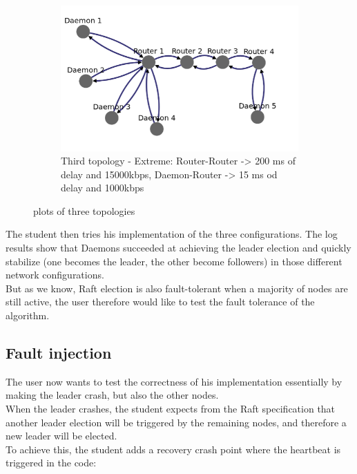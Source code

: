 \documentclass{eplmastersthesis}
\begin{document}
\begin{figure}[H]
\begin{subfigure}{0.6\textwidth}
            \includegraphics[width=1.0\linewidth]{figures/user_case/raft_topo_3.png}
            \caption{Third topology - Extreme: Router-Router -> 200 ms of delay and 15000kbps, Daemon-Router -> 15 ms od delay and 1000kbps}
            \label{fig:topo3}
          \end{subfigure}
          \caption{plots of three topologies}
          \label{fig:topologies}
        \end{figure}

        The student then tries his implementation of the three configurations.
        The log results show that Daemons succeeded at achieving the leader
        election and quickly stabilize (one becomes the leader, the other
        become followers) in those different network configurations.\\
        But as we know, Raft election is also fault-tolerant when a majority of
        nodes are still active, the user therefore would like to test the
        fault tolerance of the algorithm.

      \subsection{Fault injection}

        The user now wants to test the correctness of his implementation
        essentially by making the leader crash, but also the other nodes.\\
        When the leader crashes, the student expects from the Raft specification
        that another leader election will be triggered by the remaining
        nodes, and therefore a new leader will be elected.\\
        To achieve this, the student adds a recovery crash point where the
        heartbeat is triggered in the code:
\end{document}
